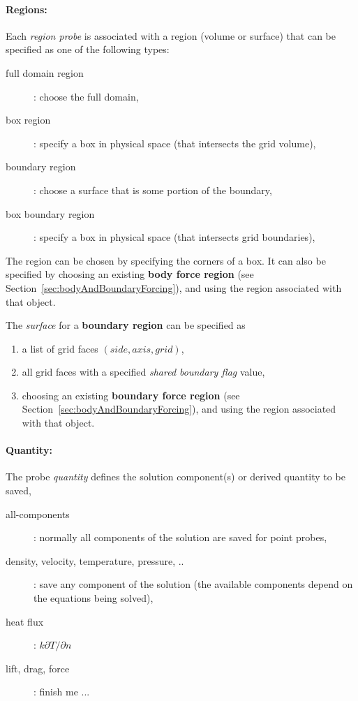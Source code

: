 \paragraph{Regions:} Each {\em region probe} is associated with a region (volume or surface) that can be 
specified as one of the following types:
\begin{description}
   \item[\quad full domain region] : choose the full domain,
   \item[\quad box region] : specify a box in physical space (that intersects the grid volume), 
   \item[\quad boundary region] : choose a surface that is some portion of the boundary, 
   \item[\quad box boundary region] : specify a box in physical space (that intersects grid boundaries), 
\end{description}
The region can be chosen by specifying the corners of a box. It can also
be specified by choosing an existing {\bf body force region} (see Section~\ref{sec:bodyAndBoundaryForcing}),
and using the region associated with that object.

\noindent The {\em surface} for a {\bf boundary region} can be specified as
\begin{enumerate}
  \item a list of grid faces $(side,axis,grid)$,
  \item all grid faces with a specified {\em shared boundary flag} value,
  \item choosing an existing {\bf boundary force region} (see Section~\ref{sec:bodyAndBoundaryForcing}), 
        and using the region associated with that object.
\end{enumerate}

\paragraph{Quantity:} The probe {\em quantity} defines the solution component(s) or derived quantity to be saved, 
\begin{description}
    \item[\quad all-components] : normally all components of the solution are saved for point probes,
   \item[\quad density, velocity, temperature, pressure, ..] : save any component of the solution (the available components depend
                on the equations being solved), 
   \item[\quad heat flux] : $k\partial T/\partial n$ 
   \item[\quad lift, drag, force] : finish me ...
\end{description}

